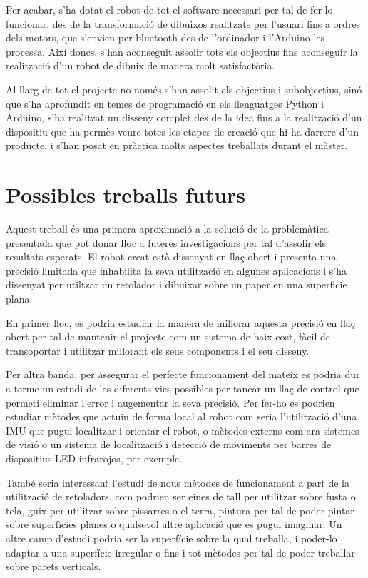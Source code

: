 Per acabar, s'ha dotat el robot de tot el software necessari per tal de fer-lo funcionar, des de la transformació de dibuixos realitzats per l'usuari fins a ordres dels motors, que s'envien per bluetooth des de l'ordinador i l'Arduino les processa. Així doncs, s'han aconseguit assolir tots els objectius fins aconseguir la realització d'un robot de dibuix de manera molt satisfactòria.

Al llarg de tot el projecte no només s'han assolit els objectius i subobjectius, sinó que s'ha aprofundit en temes de programació en els llenguatges Python i Arduino, s'ha realitzat un disseny complet des de la idea fins a la realització d'un dispositiu que ha permès veure totes les etapes de creació que hi ha darrere d'un producte, i s'han posat en pràctica molts aspectes treballats durant el màster.


\section{Possibles treballs futurs} \label{sec:treballsfuturs}
Aquest treball és una primera aproximació a la solució de la problemàtica presentada que pot donar lloc a futeres investigacions per tal d'assolir els resultats esperats. El robot creat està dissenyat en llaç obert  i presenta una precisió limitada que inhabilita la seva utilització en algunes aplicacions i s'ha dissenyat per utiltzar un retolador i dibuixar sobre un paper  en una superficie plana. 

En primer lloc, es podria estudiar la manera de millorar aquesta precisió en llaç obert per tal de mantenir el projecte com un sistema de baix cost, fàcil de transoportar i utilitzar millorant els seus components i el seu disseny. 

Per altra banda, per assegurar el perfecte funcionament del mateix es podria dur a terme un estudi de les diferents vies possibles per tancar un llaç de control que permeti eliminar l'error i augementar la seva precisió. Per fer-ho es podrien estudiar mètodes que actuin de forma local al robot com seria l'utilització d'una IMU que pugui localitzar i orientar el robot, o mètodes externs com ara sistemes de visió o un sistema de localització i detecció de moviments per barres de dispositius LED infrarojos, per exemple. 

També seria interessant l'estudi de nous mètodes de funcionament a part de la utilització de retoladors, com podrien ser eines de tall per utilitzar sobre fusta o tela, guix per utilitzar sobre pissarres o el terra, pintura per tal de poder pintar sobre superfícies planes o qualsevol altre aplicació que es pugui imaginar. Un altre camp d'estudi podria ser la superfície sobre la qual treballa, i poder-lo adaptar a una superfície irregular o fins i tot mètodes per tal de poder treballar sobre parets verticals. 